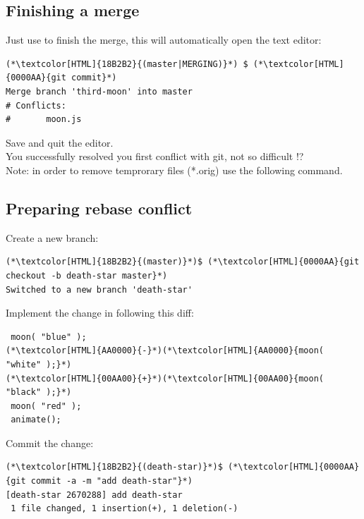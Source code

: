 \subsection{Finishing a merge}
\begin{frame}[fragile]
  \subslidetitle

  Just use  to finish the merge, this will automatically open the text editor:
  \begin{lstlisting}
(*\textcolor[HTML]{18B2B2}{(master|MERGING)}*) $ (*\textcolor[HTML]{0000AA}{git commit}*)
Merge branch 'third-moon' into master
# Conflicts:
#       moon.js
\end{lstlisting}
  Save and quit the editor.
  \\
  \vspace{1em}
  You successfully resolved you first conflict with git, not so difficult !?
  \\
  \vspace{1em}
  Note: in order to remove temprorary files (*.orig) use the following  command.

\end{frame}

\subsection{Preparing rebase conflict}
\begin{frame}[fragile]
  \subslidetitle

  Create a new  branch:
  \begin{lstlisting}
(*\textcolor[HTML]{18B2B2}{(master)}*)$ (*\textcolor[HTML]{0000AA}{git checkout -b death-star master}*)
Switched to a new branch 'death-star'
\end{lstlisting}

  Implement the change in  following this diff:

  \begin{lstlisting}
 moon( "blue" );
(*\textcolor[HTML]{AA0000}{-}*)(*\textcolor[HTML]{AA0000}{moon( "white" );}*)
(*\textcolor[HTML]{00AA00}{+}*)(*\textcolor[HTML]{00AA00}{moon( "black" );}*)
 moon( "red" );
 animate();
\end{lstlisting}

  Commit the change:
  \begin{lstlisting}
(*\textcolor[HTML]{18B2B2}{(death-star)}*)$ (*\textcolor[HTML]{0000AA}{git commit -a -m "add death-star"}*)
[death-star 2670288] add death-star
 1 file changed, 1 insertion(+), 1 deletion(-)
\end{lstlisting}
\end{frame}

